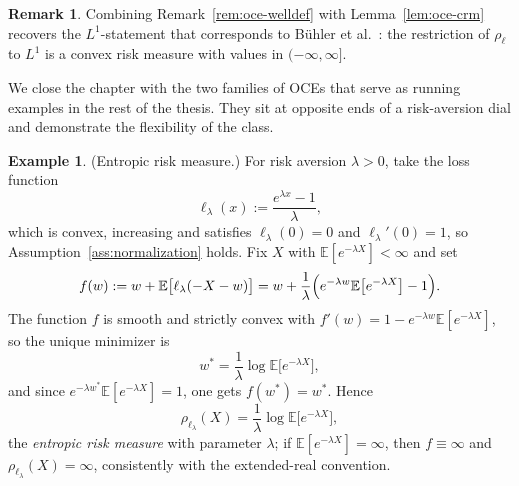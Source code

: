 \documentclass[11pt,a4paper]{report}
\numberwithin{equation}{chapter}
\theoremstyle{plain}
\theoremstyle{definition}
\newtheorem{example}[proposition]{Example}
\newtheorem{remark}[proposition]{Remark}
\newcommand{\E}{\mathbb{E}}
\begin{document}
\begin{remark}\label{rem:oce-on-L1}
    Combining Remark~\ref{rem:oce-welldef} with Lemma~\ref{lem:oce-crm} recovers the $L^1$-statement that corresponds to B\"uhler et al.\ \cite[Lemma~3.5]{buehler}: the restriction of $\rho_\ell$ to $L^1$ is a convex risk measure with values in $(-\infty,\infty]$.
\end{remark}

We close the chapter with the two families of OCEs that serve as running examples in the rest of the thesis. They sit at opposite ends of a risk-aversion dial and demonstrate the flexibility of the class.

\begin{example}\label{ex:entropic}
    (Entropic risk measure.) For risk aversion $\lambda>0$, take the loss function
    \[
        \ell_\lambda(x):=\frac{e^{\lambda x}-1}{\lambda},
    \]
    which is convex, increasing and satisfies $\ell_\lambda(0)=0$ and $\ell_\lambda'(0)=1$, so Assumption~\ref{ass:normalization} holds. Fix $X$ with $\E[e^{-\lambda X}]<\infty$ and set
    \[
        f(w):=w+\E\bigl[\ell_\lambda(-X-w)\bigr]=w+\frac{1}{\lambda}\Bigl(e^{-\lambda w}\E\bigl[e^{-\lambda X}\bigr]-1\Bigr).
    \]
    The function $f$ is smooth and strictly convex with $f'(w)=1-e^{-\lambda w}\E[e^{-\lambda X}]$, so the unique minimizer is
    \[
        w^*=\frac{1}{\lambda}\log\E\bigl[e^{-\lambda X}\bigr],
    \]
    and since $e^{-\lambda w^*}\E[e^{-\lambda X}]=1$, one gets $f(w^*)=w^*$. Hence
    \[
        \rho_{\ell_\lambda}(X)=\frac{1}{\lambda}\log\E\bigl[e^{-\lambda X}\bigr],
    \]
    the \emph{entropic risk measure} with parameter $\lambda$; if $\E[e^{-\lambda X}]=\infty$, then $f\equiv\infty$ and $\rho_{\ell_\lambda}(X)=\infty$, consistently with the extended-real convention.
\end{example}
\end{document}
